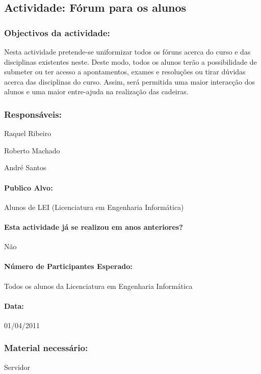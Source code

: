 \subsection{Actividade: Fórum para os alunos} %

\subsubsection*{Objectivos da actividade:}
Nesta actividade pretende-se uniformizar todos os fóruns acerca do curso e das disciplinas existentes neste. Deste modo, todos os alunos terão a possibilidade de submeter ou ter acesso a apontamentos, exames e resoluções ou tirar dúvidas acerca das disciplinas do curso. Assim, será permitida uma maior interacção dos alunos e uma maior entre-ajuda na realização das cadeiras. 

\subsubsection*{Responsáveis:}
\begin{itemizedash}
	\item{Raquel Ribeiro}
	\item{Roberto Machado}
	\item{André Santos}
\end{itemizedash}

\paragraph{Publico Alvo: }
Alunos de LEI (Licenciatura em Engenharia Informática)

\paragraph{Esta actividade já se realizou em anos anteriores?}
Não

\paragraph{Número de Participantes Esperado:}
Todos os alunos da Licenciatura em Engenharia Informática

\paragraph{Data:} 01/04/2011

\subsubsection*{Material necessário:}
\begin{itemizedash}
	\item{Servidor}
\end{itemizedash}


